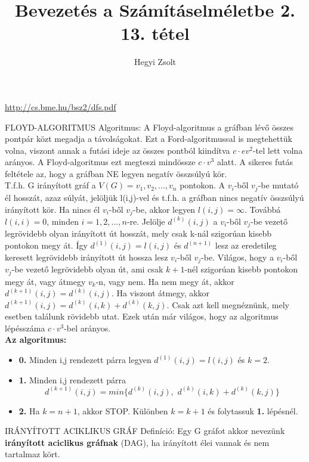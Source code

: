 \documentclass[]{article}
\title{Bevezetés a Számításelméletbe 2.\\{\large 13. tétel}}
\author{Hegyi Zsolt}
\begin{document}
\maketitle
\url{http://cs.bme.hu/bsz2/dfs.pdf}
\begin{framed}
FLOYD-ALGORITMUS Algoritmus: A Floyd-algoritmus a gráfban lévő összes pontpár közt megadja a távolságokat. Ezt a Ford-algoritmussal is megtehettük volna, viszont annak a futási ideje az összes pontból kiindítva $c\cdot ev^2$-tel lett volna arányos. A Floyd-algoritmus ezt megteszi mindössze $c\cdot v^3$ alatt. A sikeres futás feltétele az, hogy a gráfban NE legyen negatív összsúlyú kör.\\
T.f.h. G irányított gráf a $V(G) = {v_1, v_2,..., v_n}$ pontokon. A $v_i$-ből $v_j$-be mutató él hosszát, azaz súlyát, jelöljük l(i,j)-vel és t.f.h. a gráfban nincs negatív összsúlyú irányított kör. Ha nincs él $v_i$-ből $v_j$-be, akkor legyen $l(i,j) = \infty$. Továbbá $l(i,i) = 0$, minden $i = 1, 2,..., n$-re. Jelölje $d^{(k)}(i,j)$ a $v_i$-ből $v_j$-be vezető legrövidebb olyan irányított út hosszát, mely csak k-nál szigorúan kisebb pontokon megy át. Így $d^{(1)}(i,j) = l(i,j)$ és $d^{(n+1)}$ lesz az eredetileg keresett legrövidebb irányított út hossza lesz $v_i$-ből $v_j$-be. Világos, hogy a $v_i$-ből $v_j$-be vezető legrövidebb olyan út, ami csak $k + 1$-nél szigorúan kisebb pontokon megy át, vagy átmegy $v_k$-n, vagy nem. Ha nem megy át, akkor $d^{(k+1)}(i,j) = d^{(k)}(i,j)$. Ha viszont átmegy, akkor $d^{(k+1)}(i,j) = d^{(k)}(i,k) + d^{(k)}(k,j)$. Csak azt kell megnéznünk, mely esetben találunk rövidebb utat. Ezek után már világos, hogy az algoritmus lépésszáma $c\cdot v^3$-bel arányos.
\\
\textbf{Az algoritmus:}
\begin{itemize}
\item{\textbf{0.}} Minden i,j rendezett párra legyen $d^{(1)}(i,j) = l(i,j)$ és $k=2$.
\item{\textbf{1.}} Minden i,j rendezett párra
$$d^{(k+1)}(i,j) = min\{d^{(k)}(i,j),\,\, d^{(k)}(i,k) + d^{(k)}(k,j)\}$$
\item{\textbf{2.}} Ha $k = n + 1$, akkor STOP. Különben $k = k + 1$ és folytassuk \textbf{1.} lépésnél.
\end{itemize}
\end{framed}
\begin{shaded}
IRÁNYÍTOTT ACIKLIKUS GRÁF Definíció: Egy G gráfot akkor nevezünk \textbf{irányított aciclikus gráfnak} (DAG), ha irányított élei vannak és nem tartalmaz kört.
\end{shaded}
\end{document}
